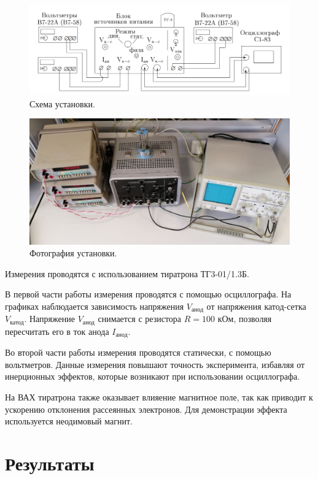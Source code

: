 \documentclass[12pt,a4paper]{article}
\begin{document}
	\begin{figure}[H]
		\centering
		\includegraphics[width=0.9\linewidth]{res/scheme.png}
		\caption{Схема установки.}
		\label{fig:scheme}
	\end{figure}
	\begin{figure}[H]
		\centering
		\includegraphics[width=0.9\linewidth]{photos/setup.jpg}
		\caption{Фотография установки.}
		\label{fig:setup}
	\end{figure}
	
	Измерения проводятся с использованием тиратрона ТГ3-01/1.3Б.
	
	В первой части работы измерения проводятся с помощью осциллографа. На графиках наблюдается зависимость напряжения $V_{\text{анод}}$ от напряжения катод-сетка $V_{\text{катод}}$. Напряжение $V_{\text{анод}}$ снимается с резистора $R = 100$ кОм, позволяя пересчитать его в ток анода $I_{\text{анод}}$.
	
	Во второй части работы измерения проводятся статически, с помощью вольтметров. Данные измерения повышают точность эксперимента, избавляя от инерционных эффектов, которые возникают при использовании осциллографа.
	
	На ВАХ тиратрона также оказывает влияение магнитное поле, так как приводит к ускорению отклонения рассеянных электронов. Для демонстрации эффекта используется неодимовый магнит.

	\newpage

	\section*{Результаты}
	
\end{document}
